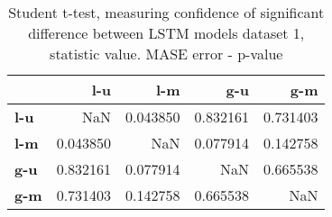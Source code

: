 \begin{table}[h]
\centering
\caption{Student t-test, measuring confidence of significant difference between LSTM models dataset 1, statistic value. MASE error - p-value}
\label{table:ttest-p-values-lstm-experiments-MASE-dataset-1}
\begin{tabular}{lrrrr}
\toprule
{} &       l-u &       l-m &       g-u &       g-m \\
\midrule
\textbf{l-u} &       NaN &  0.043850 &  0.832161 &  0.731403 \\
\textbf{l-m} &  0.043850 &       NaN &  0.077914 &  0.142758 \\
\textbf{g-u} &  0.832161 &  0.077914 &       NaN &  0.665538 \\
\textbf{g-m} &  0.731403 &  0.142758 &  0.665538 &       NaN \\
\bottomrule
\end{tabular}
\end{table}
